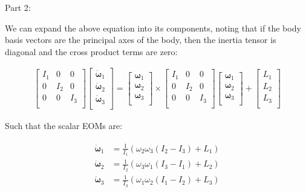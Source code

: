 \documentclass[
]{article}
\begin{document}
Part 2:

We can expand the above equation into its components, noting that if the
body basis vectors are the principal axes of the body, then the inertia
tensor is diagonal and the cross product terms are zero:

\[\begin{aligned}
\begin{bmatrix}
        I_1 & 0 & 0 \\
        0 & I_2 & 0 \\
        0 & 0 & I_3 \\
    \end{bmatrix}
    \begin{bmatrix}
        \dot{\boldsymbol{\omega}}_1 \\
        \dot{\boldsymbol{\omega}}_2 \\
        \dot{\boldsymbol{\omega}}_3 \\
    \end{bmatrix}
    =
    \begin{bmatrix}
        \boldsymbol{\omega}_1 \\
        \boldsymbol{\omega}_2 \\
        \boldsymbol{\omega}_3 \\
    \end{bmatrix}
    \times
    \begin{bmatrix}
        I_1 & 0 & 0 \\
        0 & I_2 & 0 \\
        0 & 0 & I_3 \\
    \end{bmatrix}
    \begin{bmatrix}
        \boldsymbol{\omega}_1 \\
        \boldsymbol{\omega}_2 \\
        \boldsymbol{\omega}_3 \\
    \end{bmatrix}
    +
    \begin{bmatrix}
        L_1 \\
        L_2 \\
        L_3 \\
    \end{bmatrix}
\end{aligned}\]

Such that the scalar EOMs are:

\[\begin{aligned}
\begin{aligned}
    \dot{\boldsymbol{\omega}}_1 &= \frac{1}{I_1} \left(\omega_2 \omega_3 \left(I_2 - I_3\right) + L_1 \right)\\
    \dot{\boldsymbol{\omega}}_2 &= \frac{1}{I_2} \left(\omega_3 \omega_1 \left(I_3 - I_1\right) + L_2 \right)\\
    \dot{\boldsymbol{\omega}}_3 &= \frac{1}{I_3} \left(\omega_1 \omega_2 \left(I_1 - I_2\right) + L_3 \right)\\
\end{aligned}
\end{aligned}\]
\end{document}
